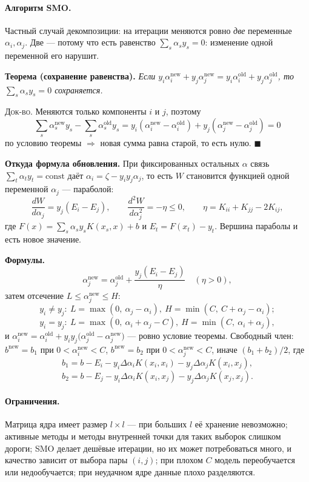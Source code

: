 \paragraph{Алгоритм SMO.}
Частный случай декомпозиции: на итерации меняются ровно \emph{две} переменные
$\alpha_i, \alpha_j$. Две — потому что есть равенство
$\sum_s \alpha_s y_s = 0$: изменение одной переменной его нарушит.

\textbf{Теорема (сохранение равенства).} \textit{Если
$y_i\alpha_i^{\text{new}} + y_j\alpha_j^{\text{new}}
 = y_i\alpha_i^{\text{old}} + y_j\alpha_j^{\text{old}}$, то
$\sum_s \alpha_s y_s = 0$ сохраняется.}

\textsc{Док-во.} Меняются только компоненты $i$ и $j$, поэтому
\[
  \sum_s \alpha_s^{\text{new}}y_s - \sum_s \alpha_s^{\text{old}}y_s
   = y_i(\alpha_i^{\text{new}} - \alpha_i^{\text{old}})
   + y_j(\alpha_j^{\text{new}} - \alpha_j^{\text{old}}) = 0
\]
по условию теоремы $\Rightarrow$ новая сумма равна старой, то есть нулю.
$\blacksquare$

\textbf{Откуда формула обновления.} При фиксированных остальных $\alpha$ связь
$\sum_t\alpha_ty_t = \mathrm{const}$ даёт $\alpha_i = \zeta - y_iy_j\alpha_j$,
то есть $W$ становится функцией одной переменной $\alpha_j$ — параболой:
\[
  \frac{dW}{d\alpha_j} = y_j(E_i - E_j) ,
  \qquad
  \frac{d^2W}{d\alpha_j^2} = -\eta \le 0 ,
  \qquad
  \eta = K_{ii} + K_{jj} - 2K_{ij} ,
\]
где $F(x) = \sum_s\alpha_sy_sK(x_s,x) + b$ и $E_t = F(x_t) - y_t$. Вершина
параболы и есть новое значение.

\textbf{Формулы.}
\[
  \alpha_j^{\text{new}} = \alpha_j^{\text{old}}
    + \frac{y_j(E_i - E_j)}{\eta} \quad (\eta > 0) ,
\]
затем отсечение $L \le \alpha_j^{\text{new}} \le H$:
\[
  y_i \ne y_j :\ L = \max(0,\ \alpha_j - \alpha_i) ,\
                 H = \min(C,\ C + \alpha_j - \alpha_i) ;
\]
\[
  y_i = y_j :\ L = \max(0,\ \alpha_i + \alpha_j - C) ,\
               H = \min(C,\ \alpha_i + \alpha_j) ,
\]
и $\alpha_i^{\text{new}} = \alpha_i^{\text{old}}
 + y_iy_j\big(\alpha_j^{\text{old}} - \alpha_j^{\text{new}}\big)$ — ровно
условие теоремы. Свободный член:
$b^{\text{new}} = b_1$ при $0 < \alpha_i^{\text{new}} < C$,
$b^{\text{new}} = b_2$ при $0 < \alpha_j^{\text{new}} < C$, иначе
$(b_1+b_2)/2$, где
\[
  b_1 = b - E_i - y_i\Delta\alpha_i K(x_i,x_i) - y_j\Delta\alpha_j K(x_i,x_j) ,
\]
\[
  b_2 = b - E_j - y_i\Delta\alpha_i K(x_i,x_j) - y_j\Delta\alpha_j K(x_j,x_j) .
\]

\paragraph{Ограничения.}
Матрица ядра имеет размер $l\times l$ — при больших $l$ её хранение
невозможно; активные методы и методы внутренней точки для таких выборок
слишком дороги; SMO делает дешёвые итерации, но их может потребоваться много,
и качество зависит от выбора пары $(i,j)$; при плохом $C$ модель
переобучается или недообучается; при неудачном ядре данные плохо разделяются.

\seefull{гл.~4, \S1--\S4 (численный пример SMO в \S4)}
